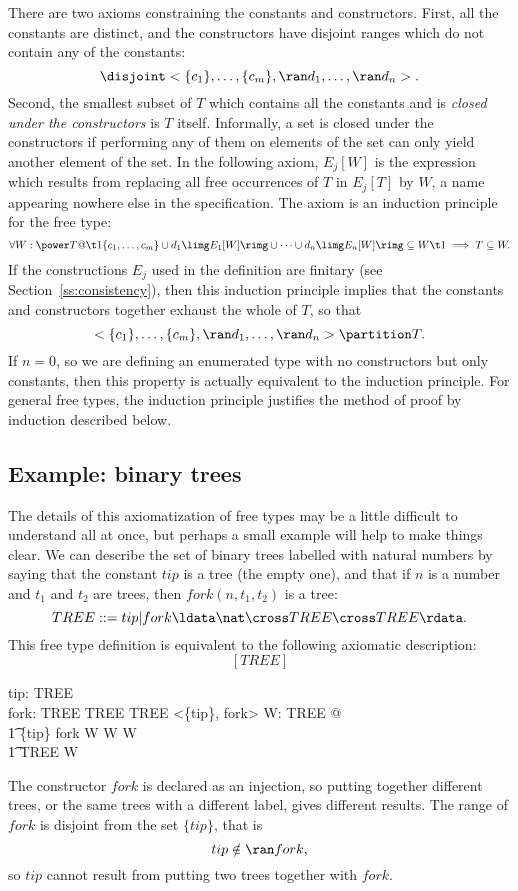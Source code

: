 There are two axioms constraining the constants and constructors.
First, all the constants are distinct, and the constructors have
disjoint ranges which do not contain any of the constants:
\[ \disjoint <\{c_1\}, \ldots, \{c_m\}, \ran d_1, \ldots, \ran d_n>. \]
\new Second, the smallest subset of $T$ which contains all the
constants and is {\em closed under the constructors\/} is $T$ itself.
Informally, a set is closed under the constructors if performing any
of them on elements of the set can only yield another element of the
set.  In the following axiom, $E_j[W]$ is the expression which
results from replacing all free occurrences of $T$ in $E_j[T]$ by
$W$, a name appearing nowhere else in the specification. The axiom
is an induction principle for the free type:
\[
        \forall W: \power T @ \\
\t1         \{c_1, \ldots, c_m\} \cup d_1\limg E_1[W]\rimg %
		\cup \cdots \cup d_n\limg E_n[W]\rimg \subseteq W \\
\t1	    \implies T \subseteq W.
\]
If the constructions $E_j$ used in the definition are finitary
(see Section~\ref{ss:consistency}), then this induction principle
implies
that the constants and
constructors together exhaust the whole of $T$, so that
\[ <\{c_1\}, \ldots, \{c_m\}, \ran d_1, 
	\ldots, \ran d_n> \partition T. \]
If $n = 0$, so we are defining an enumerated type with no
constructors but only constants, then this property is actually
equivalent to the induction principle.  For general free types, the
induction principle justifies the method of proof by induction
described below.

\subsection{Example: binary trees}

The details of this axiomatization of free types may be a little
difficult to understand all at once, but perhaps a small example
will help to make things clear.  We can describe the set of binary
trees labelled with natural numbers by saying that the constant
$tip$ is a tree (the empty one), and that if $n$ is a number and
$t_1$ and $t_2$ are trees, then $fork(n,t_1,t_2)$ is a tree:
\[ TREE ::= tip | fork \ldata \nat \cross TREE \cross TREE \rdata. \]
This free type definition is equivalent to the following 
axiomatic description:
\[ [TREE] \]
\begin{axdef}
	tip: TREE \\
	fork: \nat \cross TREE \cross TREE \inj TREE
\where
        \disjoint <\{tip\}, \ran fork>
\also
        \forall W: \power TREE @ \\
\t1         \{tip\} \cup fork \limg \nat \cross W \cross W \rimg \subseteq W \\
\t1	    \implies TREE \subseteq W
\end{axdef}
The constructor $fork$ is declared as an injection, so
putting together different trees, or the same trees with a different
label, gives different results.  The range of $fork$ is disjoint
from the set $\{tip\}$, that is
\[ tip \notin \ran fork, \]
so $tip$ cannot result from putting two trees together with $fork$.

